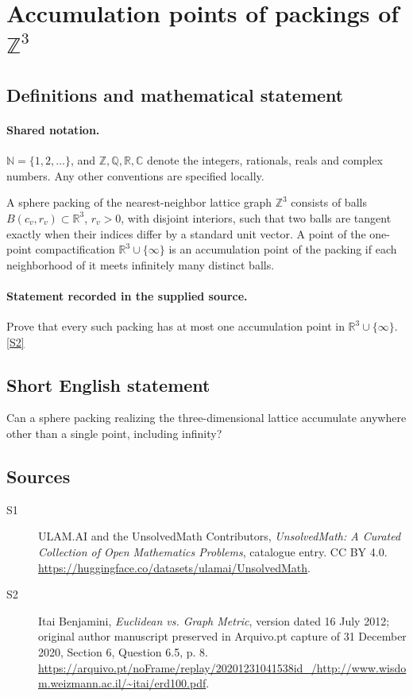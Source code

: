 \documentclass[11pt]{article}
\newcommand{\sref}[2]{\hyperlink{source:#1:#2}{[S#2]}}
\begin{document}
\section{Accumulation points of packings of $\mathbb{Z}^3$}\label{statement}

\subsection{Definitions and mathematical statement}

\paragraph{Shared notation.}$\mathbb N=\{1,2,\ldots\}$, and $\mathbb Z,\mathbb Q,\mathbb R,\mathbb C$ denote the integers, rationals, reals and complex numbers. Any other conventions are specified locally.


A sphere packing of the nearest-neighbor lattice graph $\mathbb Z^3$ consists of balls $B(c_v,r_v)\subset\mathbb R^3$, $r_v>0$, with disjoint interiors, such that two balls are tangent exactly when their indices differ by a standard unit vector. A point of the one-point compactification $\mathbb R^3\cup\{\infty\}$ is an accumulation point of the packing if each neighborhood of it meets infinitely many distinct balls.
\paragraph{Statement recorded in the supplied source.}
Prove that every such packing has at most one accumulation point in $\mathbb R^3\cup\{\infty\}$. \sref{statement}{2}
\subsection{Short English statement}
Can a sphere packing realizing the three-dimensional lattice accumulate anywhere other than a single point, including infinity?
\subsection{Sources}
\begin{description}
\item[\hypertarget{source:statement:1}{S1}] ULAM.AI and the UnsolvedMath Contributors, \emph{UnsolvedMath: A Curated Collection of Open Mathematics Problems}, catalogue entry. CC BY 4.0. \url{https://huggingface.co/datasets/ulamai/UnsolvedMath}.
\item[\hypertarget{source:statement:2}{S2}] Itai Benjamini, \emph{Euclidean vs. Graph Metric}, version dated 16 July 2012; original author manuscript preserved in Arquivo.pt capture of 31 December 2020, Section 6, Question 6.5, p. 8. \url{https://arquivo.pt/noFrame/replay/20201231041538id_/http://www.wisdom.weizmann.ac.il/~itai/erd100.pdf}.
\end{description}
\label{end:statement}
\end{document}
